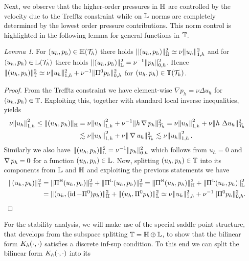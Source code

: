 \documentclass[pdflatex,sn-mathphys,Numbered]{sn-jnl}%
\theoremstyle{remark}%
\newtheorem{lemma}[theorem]{Lemma}
\theoremstyle{definition}%
\begin{document}
Next, we observe that the higher-order pressures in $\mathbb{H}$ are controlled by the velocity
due to the Trefftz constraint while on $\mathbb{L}$ norms are completely determined by
the lowest order pressure contributions. 
This norm control is highlighted in the following lemma for general functions in $\mathbb{T}$.
\begin{lemma}\label{lem:normeq}
  For $(u_h,p_h) \in \mathbb{H}({\mathcal{T}_h})$ there holds
  $
  \Vert (u_h,p_h) \Vert_{\mathbb{H}}^2 \simeq \nu \Vert u_h \Vert_{1,h}^2
  $
  and for $(u_h,p_h) \in \mathbb{L}({\mathcal{T}_h})$ there holds
  $
  \Vert (u_h,p_h) \Vert_{\mathbb{L}}^2 = \nu^{-1} \Vert p_h \Vert_{0,h}^2. 
  $
  Hence $\Vert (u_h,p_h) \Vert_{\mathbb{T}}^2 \simeq \nu \Vert u_h \Vert_{1,h}^2 + \nu^{-1} \Vert \Pi^0 p_h \Vert_{0,h}^2$
  for $(u_h,p_h) \in \mathbb{T}({\mathcal{T}_h})$. 
\end{lemma}
\begin{proof}
  From the Trefftz constraint we have element-wise $\nabla p_h = \nu
  \Delta u_h$ for $(u_h,p_h) \in \mathbb{T}$. Exploiting this, together with
  standard local inverse inequalities, yields
  \begin{align*}
    \nu \norm{u_h}_{1,h}^2 \leq \Vert (u_h,p_h) \Vert_{\mathbb{H}} & = \nu \norm{u_h}_{1,h}^2 + \nu^{-1} \Vert h \operatorname{\nabla} p_h \Vert_{{\mathcal{T}_h}}^2 = \nu \norm{u_h}_{1,h}^2 + \nu \Vert h \ \Delta u_h \Vert_{{\mathcal{T}_h}}^2 \\
    & \lesssim \nu \norm{u_h}_{1,h}^2 +  \nu \Vert \operatorname{\nabla} u_h \Vert_{{\mathcal{T}_h}}^2 \lesssim \nu \norm{u_h}_{1,h}^2. 
  \end{align*}
  Similarly we also have $\Vert (u_h,p_h) \Vert_{\mathbb{L}}^2 = \nu^{-1} \Vert p_h \Vert_{0,h}^2$ which follows from
  $u_h=0$ and $\operatorname{\nabla} p_h = 0$ for a function $(u_h,p_h) \in \mathbb{L}$. Now, splitting $(u_h,p_h) \in \mathbb{T}$ into its components from
  $\mathbb{L}$  and $\mathbb{H}$ and exploiting the previous statements we have
  \begin{align*}
    \Vert (u_h,p_h) \Vert_{\mathbb{T}}^2
    & = \Vert \Pi^{\mathbb{H}}(u_h,p_h) \Vert_{\mathbb{T}}^2 +   \Vert \Pi^{\mathbb{L}}(u_h,p_h) \Vert_{\mathbb{T}}^2
    = \Vert \Pi^{\mathbb{H}}(u_h,p_h) \Vert_{\mathbb{H}}^2 +   \Vert \Pi^{\mathbb{L}}(u_h,p_h) \Vert_{\mathbb{L}}^2 \\
    & = \Vert (u_h,(\operatorname{id} - \Pi^0)p_h) \Vert_{\mathbb{H}}^2 + \Vert (u_h, \Pi^0 p_h) \Vert_{\mathbb{L}}^2
    \simeq \nu \Vert u_h \Vert_{1,h}^2 + \nu^{-1} \Vert \Pi^0 p_h \Vert_{0,h}^2.
  \end{align*}
\end{proof}
For the stability analysis, we will make use of the special saddle-point structure,  
that develops from the subspace splitting $\mathbb{T} = \mathbb{H} \oplus \mathbb{L}$, to show that the bilinear form $K_h(\cdot,\cdot)$ satisfies a discrete inf-sup condition.
To this end we can split the bilinear form $K_h(\cdot,\cdot)$ into its
\end{document}
